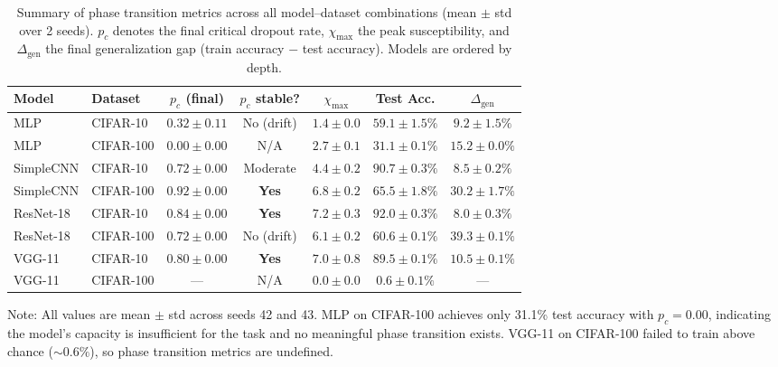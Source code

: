 \documentclass{article}
\begin{document}
\begin{table}[t]
    \centering
    \caption{Summary of phase transition metrics across all model--dataset combinations (mean $\pm$ std over 2 seeds). $p_c$ denotes the final critical dropout rate, $\chi_{\max}$ the peak susceptibility, and $\Delta_{\text{gen}}$ the final generalization gap (train accuracy $-$ test accuracy). Models are ordered by depth.}
    \label{tab:summary}
    \begin{tabular}{llccccc}
        \toprule
        \textbf{Model} & \textbf{Dataset} & \textbf{$p_c$ (final)} & \textbf{$p_c$ stable?} & \textbf{$\chi_{\max}$} & \textbf{Test Acc.} & \textbf{$\Delta_{\text{gen}}$} \\
        \midrule
        MLP            & CIFAR-10  & $0.32 \pm 0.11$ & No (drift)   & $1.4 \pm 0.0$  & $59.1 \pm 1.5\%$  & $9.2 \pm 1.5\%$ \\
        MLP            & CIFAR-100 & $0.00 \pm 0.00$ & N/A          & $2.7 \pm 0.1$  & $31.1 \pm 0.1\%$  & $15.2 \pm 0.0\%$ \\
        SimpleCNN      & CIFAR-10  & $0.72 \pm 0.00$ & Moderate     & $4.4 \pm 0.2$  & $90.7 \pm 0.3\%$  & $8.5 \pm 0.2\%$  \\
        SimpleCNN      & CIFAR-100 & $0.92 \pm 0.00$ & \textbf{Yes} & $6.8 \pm 0.2$  & $65.5 \pm 1.8\%$  & $30.2 \pm 1.7\%$ \\
        ResNet-18      & CIFAR-10  & $0.84 \pm 0.00$ & \textbf{Yes} & $7.2 \pm 0.3$  & $92.0 \pm 0.3\%$  & $8.0 \pm 0.3\%$  \\
        ResNet-18      & CIFAR-100 & $0.72 \pm 0.00$ & No (drift)   & $6.1 \pm 0.2$  & $60.6 \pm 0.1\%$  & $39.3 \pm 0.1\%$ \\
        VGG-11         & CIFAR-10  & $0.80 \pm 0.00$ & \textbf{Yes} & $7.0 \pm 0.8$  & $89.5 \pm 0.1\%$  & $10.5 \pm 0.1\%$ \\
        VGG-11         & CIFAR-100 & ---              & N/A          & $0.0 \pm 0.0$  & $0.6 \pm 0.1\%$   & --- \\
        \bottomrule
    \end{tabular}\par
    \vspace{0.3em}
    \begin{minipage}{0.92\textwidth}
    \small Note: All values are mean $\pm$ std across seeds 42 and 43. MLP on CIFAR-100 achieves only 31.1\% test accuracy with $p_c = 0.00$, indicating the model's capacity is insufficient for the task and no meaningful phase transition exists. VGG-11 on CIFAR-100 failed to train above chance (${\sim}0.6\%$), so phase transition metrics are undefined.
    \end{minipage}
\end{table}
\end{document}
